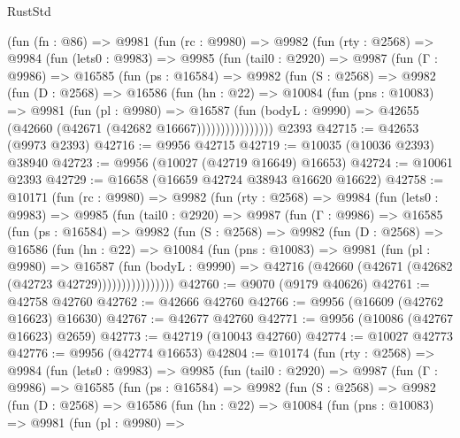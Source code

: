 \begin{lexlean}{RustStd}
\begin{coremodule}
    (fun (fn : @86) =>
    @9981
      (fun (rc : @9980) =>
      @9982
        (fun (rty : @2568) =>
        @9984
          (fun (lets0 : @9983) =>
          @9985
            (fun (tail0 : @2920) =>
            @9987
              (fun (Γ : @9986) =>
              @16585
                (fun (ps : @16584) =>
                @9982
                  (fun (S : @2568) =>
                  @9982
                    (fun (D : @2568) =>
                    @16586
                      (fun (hn : @22) =>
                      @10084
                        (fun (pns : @10083) =>
                        @9981
                          (fun (pl : @9980) =>
                          @16587
                            (fun (bodyL : @9990) =>
                            @42655 (@42660 (@42671 (@42682 @16667))))))))))))))))
    @2393
@42715 := @42653 (@9973 @2393)
@42716 := @9956 @42715
@42719 := @10035 (@10036 @2393) @38940
@42723 := @9956 (@10027 (@42719 @16649) @16653)
@42724 := @10061 @2393
@42729 := @16658 (@16659 @42724 @38943 @16620 @16622)
@42758 := @10171
    (fun (rc : @9980) =>
    @9982
      (fun (rty : @2568) =>
      @9984
        (fun (lets0 : @9983) =>
        @9985
          (fun (tail0 : @2920) =>
          @9987
            (fun (Γ : @9986) =>
            @16585
              (fun (ps : @16584) =>
              @9982
                (fun (S : @2568) =>
                @9982
                  (fun (D : @2568) =>
                  @16586
                    (fun (hn : @22) =>
                    @10084
                      (fun (pns : @10083) =>
                      @9981
                        (fun (pl : @9980) =>
                        @16587
                          (fun (bodyL : @9990) =>
                          @42716 (@42660 (@42671 (@42682 (@42723 @42729))))))))))))))))
@42760 := @9070 (@9179 @40626)
@42761 := @42758 @42760
@42762 := @42666 @42760
@42766 := @9956 (@16609 (@42762 @16623) @16630)
@42767 := @42677 @42760
@42771 := @9956 (@10086 (@42767 @16623) @2659)
@42773 := @42719 (@10043 @42760)
@42774 := @10027 @42773
@42776 := @9956 (@42774 @16653)
@42804 := @10174
    (fun (rty : @2568) =>
    @9984
      (fun (lets0 : @9983) =>
      @9985
        (fun (tail0 : @2920) =>
        @9987
          (fun (Γ : @9986) =>
          @16585
            (fun (ps : @16584) =>
            @9982
              (fun (S : @2568) =>
              @9982
                (fun (D : @2568) =>
                @16586
                  (fun (hn : @22) =>
                  @10084
                    (fun (pns : @10083) =>
                    @9981
                      (fun (pl : @9980) =>

\end{coremodule}
\end{lexlean}
